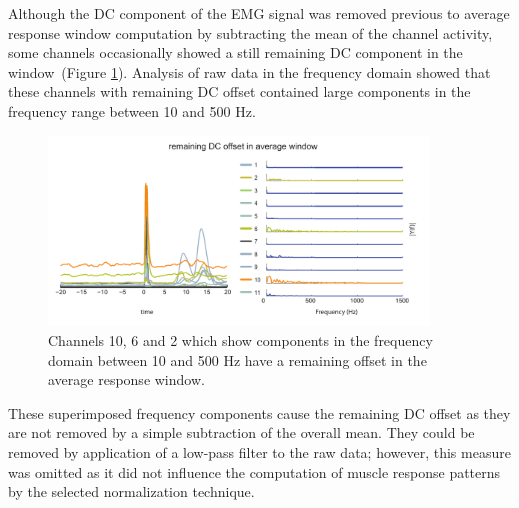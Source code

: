 \documentclass[a4paper]{article}
\newcommand{\rref}[1]{(Figure \ref{#1})}%
\begin{document}
Although the DC component of the EMG signal was removed previous to average response window computation by subtracting the mean of the channel activity, some channels occasionally showed a still remaining DC component in the  window~\rref{sg:fig:images_dc_offset_fourier}. Analysis of raw data in the frequency domain showed that these channels with remaining DC offset contained large components in the frequency range between 10 and 500 Hz.
\begin{figure}[ht]
	\centering
		\includegraphics[width=0.9\textwidth]{images/dc_offset_fourier.pdf}
	\caption{Channels 10, 6 and 2 which show components in the frequency domain between 10 and 500 Hz
	have a remaining offset in the average response window.}
	\label{sg:fig:images_dc_offset_fourier}
\end{figure}
These superimposed frequency components cause the remaining DC offset as they are not removed by a simple subtraction of the overall mean. They could be removed by application of a low-pass filter to the raw data; however, this measure was omitted as it did not influence the computation of muscle response patterns by the selected normalization technique. 
\end{document}
